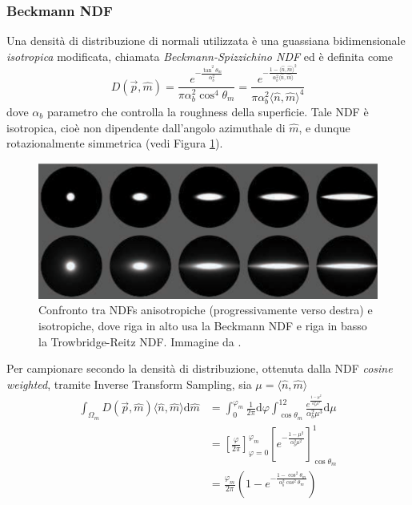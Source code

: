 \subsubsection{Beckmann NDF}
Una densit\`a di distribuzione di normali utilizzata \`e una guassiana bidimensionale \textit{isotropica} modificata, chiamata 
\textit{Beckmann-Spizzichino NDF} ed \`e definita come
\begin{equation}\label{chapter3:surface:beckmannNDF}
	D(\vec{p},\hat{m})=\frac{e^{-\frac{\tan^2\theta_m}{\alpha_b^2}}}{\pi\alpha_b^2\cos^4\theta_m}%
		=\frac{e^{-\frac{1-\langle\hat{n},\hat{m}\rangle^2}{\alpha_b^2\langle\hat{n},\hat{m}\rangle}}}{\pi\alpha_b^2\langle\hat{n},\hat{m}\rangle^4}
\end{equation}
dove $\alpha_b$ parametro che controlla la roughness della superficie. Tale NDF \`e isotropica, cio\`e non dipendente dall'angolo azimuthale di 
$\hat{m}$, e dunque rotazionalmente simmetrica (vedi Figura \ref{chapter3:surface:anisotropicBRDF}).\par
\begin{figure}[tb]
	\centering
	\includegraphics[width=0.8\linewidth]{../assets/chapter3_surface_anisotropic_BRDF.png}
	\caption{Confronto tra NDFs anisotropiche (progressivamente verso destra) e isotropiche, dove riga in alto usa la Beckmann NDF e riga in basso
		la Trowbridge-Reitz NDF. Immagine da \cite{akenine-moller}.}
	\label{chapter3:surface:anisotropicBRDF}
\end{figure}
Per campionare secondo la densit\`a di distribuzione, ottenuta dalla NDF \textit{cosine weighted}\footnotemark{}, tramite Inverse Transform Sampling,
 sia $\mu=\langle\hat{n},\hat{m}\rangle$
\begin{align}
	\int_{\Omega_m}D(\vec{p},\hat{m})\langle\hat{n},\hat{m}\rangle\mathrm{d}\hat{m}&=%
		\int_0^{\varphi_m}\frac{1}{2\pi}\mathrm{d}\varphi\int_{\cos\theta_m}^12\frac{e^{\frac{1-\mu^2}{\alpha_b^2\mu^2}}}{\alpha_b^2\mu^3}\mathrm{d}\mu
			\nonumber \\
		&=\left[\frac{\varphi}{2\pi}\right]_{\varphi=0}^{\varphi_m}\left[e^{-\frac{1-\mu^2}{\alpha_b^2\mu^2}}\right]_{\cos\theta_m}^1 \nonumber \\
		&=\frac{\varphi_m}{2\pi}\left(1-e^{-\frac{1-\cos^2\theta_m}{\alpha_b^2\cos^2\theta_m}}\right)
\end{align}
